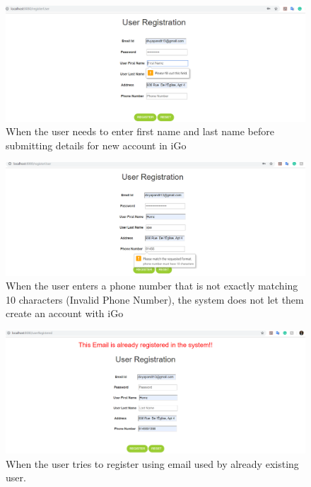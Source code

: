 \documentclass[11pt, english]{report}
\begin{document}
\begin{figure}[H]
  \includegraphics[width=1\textwidth]{images/Requiredname.PNG}
  \centering
  \caption{When the user needs to enter first name and last name before submitting details for new account in iGo
}
\end{figure}

\begin{figure}[H]
  \includegraphics[width=1\textwidth]{images/ValidPhone.PNG}
  \centering
  \caption{When the user enters a phone number that is not exactly matching 10 characters (Invalid Phone Number), the system does not let them create an account with iGo
}
\end{figure}

\begin{figure}[H]
  \includegraphics[width=1\textwidth]{images/EmailIdVerify.PNG}
  \centering
  \caption{When the user tries to register using email used by already existing user.}
\end{figure}
\end{document}
